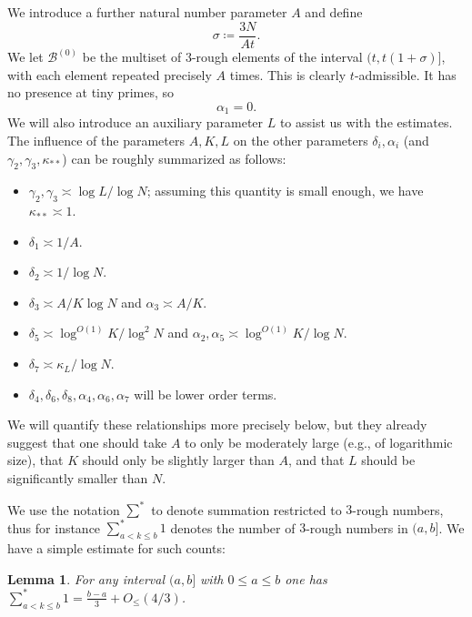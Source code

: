 \documentclass[12pt,a4paper,reqno]{amsart}
\numberwithin{equation}{section}
\theoremstyle{plain}
\newtheorem{lemma}[theorem]{Lemma}
\theoremstyle{definition}
\newcommand\tuple{{\mathcal B}}
\begin{document}
We introduce a further natural number parameter $A$ and define 
\begin{equation}\label{sigma-def}
  \sigma \coloneqq \frac{3N}{At}.
\end{equation}
We let $\tuple^{(0)}$ be the multiset of $3$-rough elements of the interval $(t, t(1+\sigma)]$, with each element repeated precisely $A$ times.  This is clearly $t$-admissible.  It has no presence at tiny primes, so
\begin{equation}\label{alpha1-vanish}
  \alpha_1 = 0.
\end{equation}
We will also introduce an auxiliary parameter $L$ to assist us with the estimates.  The influence of the parameters $A,K,L$ on the other parameters $\delta_i, \alpha_i$ (and $\gamma_2,\gamma_3,\kappa_{**}$) can be roughly summarized as follows:
\begin{itemize}
\item $\gamma_2, \gamma_3 \asymp \log L / \log N$; assuming this quantity is small enough, we have $\kappa_{**} \asymp 1$.
\item $\delta_1 \asymp 1/A$.
\item $\delta_2 \asymp 1/\log N$.
\item $\delta_3 \asymp A/K\log N$ and $\alpha_3 \asymp A/K$.
\item $\delta_5 \asymp \log^{O(1)} K/\log^2 N$ and $\alpha_2, \alpha_5 \asymp \log^{O(1)} K / \log N$.
\item $\delta_7 \asymp \kappa_L/\log N$.
\item $\delta_4, \delta_6, \delta_8, \alpha_4, \alpha_6, \alpha_7$ will be lower order terms.
\end{itemize}
We will quantify these relationships more precisely below, but they already suggest that one should take $A$ to only be moderately large (e.g., of logarithmic size), that $K$ should only be slightly larger than $A$, and that $L$ should be significantly smaller than $N$.

We use the notation $\sum^*$ to denote summation restricted to $3$-rough numbers, thus for instance $\sum_{a < k \leq b}^* 1$ denotes the number of $3$-rough numbers in $(a,b]$.  We have a simple estimate for such counts:

\begin{lemma}\label{lit}  For any interval $(a,b]$ with $0 \leq a \leq b$ one has $\sum_{a < k \leq b}^* 1 = \frac{b-a}{3} + O_{\leq}(4/3)$.
\end{lemma}
\end{document}
